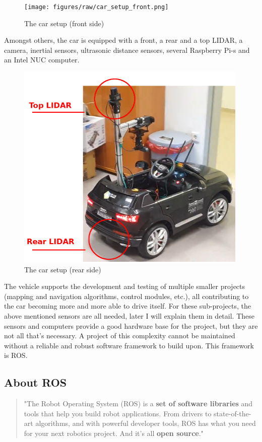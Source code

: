 \begin{figure}[!ht]
    \centering
    \texttt{[image: figures/raw/car\_setup\_front.png]}
    \caption{The car setup (front side)}
    \label{car_setup_front}
\end{figure}

Amongst others, the car is equipped with a front, a rear and a top LIDAR, a camera, inertial sensors, ultrasonic distance sensors, several Raspberry Pi-s and an Intel NUC computer.

\begin{figure}[!ht]
    \centering
    \includegraphics[height=100mm]{figures/raw/car_setup_rear.png}
    \caption{The car setup (rear side)}
    \label{car_setup_rear}
\end{figure}

The vehicle supports the development and testing of multiple smaller projects (mapping and navigation algorithms, control modules, etc.), all contributing to the car becoming more and more able to drive itself. For these sub-projects, the above mentioned sensors are all needed, later I will explain them in detail. These sensors and computers provide a good hardware base for the project, but they are not all that's necessary. A project of this complexity cannot be maintained without a reliable and robust software framework to build upon. This framework is ROS.

\subsection{About ROS}

\begin{quote}
"The Robot Operating System (ROS) is a \textbf{set of software libraries} and tools that help you build robot applications. From drivers to state-of-the-art algorithms, and with powerful developer tools, ROS has what you need for your next robotics project. And it's all \textbf{open source}."
\end{quote}

